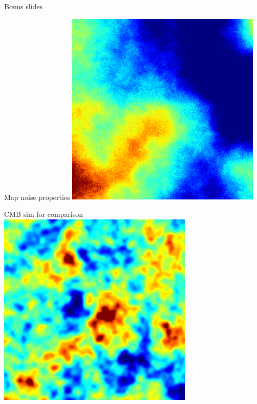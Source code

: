 \documentclass[table]{beamer}
\begin{document}

\begin{frame}{Bonus slides}
\end{frame}

\begin{frame}{Map noise properties}
	\centering
	\includegraphics[width=0.7\textwidth]{maps/noise_sim.png}
\end{frame}
\begin{frame}{CMB sim for comparison}
	\centering
	\includegraphics[width=0.7\textwidth]{maps/cmb_sim.png}
\end{frame}
\end{document}
